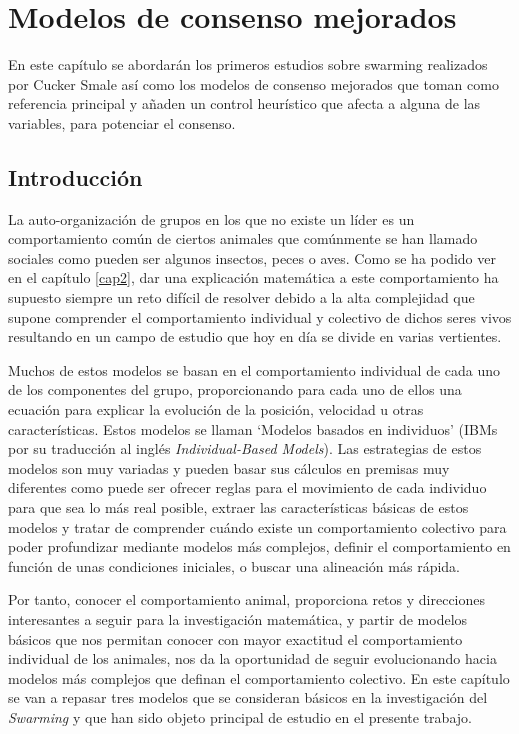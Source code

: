 \chapter{Modelos de consenso mejorados} \label{cap3}

En este capítulo se abordarán los primeros estudios sobre swarming realizados por Cucker Smale así como los modelos de consenso mejorados que toman como referencia principal y añaden un control heurístico que afecta a alguna de las variables, para potenciar el consenso.%


\section{Introducción}\label{s3_1}
La auto-organización de grupos en los que no existe un líder es un comportamiento común de ciertos animales que comúnmente se han llamado sociales como pueden ser algunos insectos, peces o aves. Como se ha podido ver en el capítulo \ref{cap2}, dar una explicación matemática a este comportamiento ha supuesto siempre un reto difícil de resolver debido a la alta complejidad que supone comprender el comportamiento individual y colectivo de dichos seres vivos resultando en un campo de estudio que hoy en día se divide en varias vertientes.

Muchos de estos modelos se basan en el comportamiento individual de cada uno de los componentes del grupo, proporcionando para cada uno de ellos una ecuación para explicar la evolución de la posición, velocidad u otras características. Estos modelos se llaman `Modelos basados en individuos' (IBMs por su traducción al inglés \textit{Individual-Based Models}). Las estrategias de estos modelos son muy variadas y pueden basar sus cálculos en premisas muy diferentes como puede ser ofrecer reglas para el movimiento de cada individuo para que sea lo más real posible, extraer las características básicas de estos modelos y tratar de comprender cuándo existe un comportamiento colectivo para poder profundizar mediante modelos más complejos, definir el comportamiento en función de unas condiciones iniciales, o buscar una alineación más rápida. 

Por tanto, conocer el comportamiento animal, proporciona retos y direcciones interesantes a seguir para la investigación matemática, y partir de modelos básicos que nos permitan conocer con mayor exactitud el comportamiento individual de los animales, nos da la oportunidad de seguir evolucionando hacia modelos más complejos que definan el comportamiento colectivo. En este capítulo se van a repasar tres modelos que se consideran básicos en la investigación del \textit{Swarming} y que han sido objeto principal de estudio en el presente trabajo.


